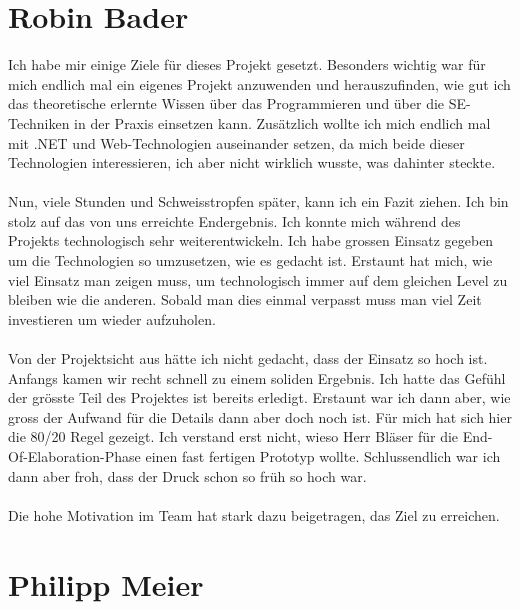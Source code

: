 	\section{Robin Bader}
	Ich habe mir einige Ziele für dieses Projekt gesetzt. Besonders wichtig war für mich endlich mal ein eigenes Projekt anzuwenden und herauszufinden, wie gut ich das theoretische erlernte Wissen über das Programmieren und über die SE-Techniken in der Praxis einsetzen kann. Zusätzlich wollte ich mich endlich mal mit .NET und Web-Technologien auseinander setzen, da mich beide dieser Technologien interessieren, ich aber nicht wirklich wusste, was dahinter steckte.\\ \\
Nun, viele Stunden und Schweisstropfen später, kann ich ein Fazit ziehen. Ich bin stolz auf das von uns erreichte Endergebnis. Ich konnte mich während des Projekts technologisch sehr weiterentwickeln. Ich habe grossen Einsatz gegeben um die Technologien so umzusetzen, wie es gedacht ist. Erstaunt hat mich, wie viel Einsatz man zeigen muss, um technologisch immer auf dem gleichen Level zu bleiben wie die anderen. Sobald man dies einmal verpasst muss man viel Zeit investieren um wieder aufzuholen.\\ \\
Von der Projektsicht aus hätte ich nicht gedacht, dass der Einsatz so hoch ist. Anfangs kamen wir recht schnell zu einem soliden Ergebnis. Ich hatte das Gefühl der grösste Teil des Projektes ist bereits erledigt. Erstaunt war ich dann aber, wie gross der Aufwand für die Details dann aber doch noch ist. Für mich hat sich hier die 80/20 Regel gezeigt. Ich verstand erst nicht, wieso Herr Bläser für die End-Of-Elaboration-Phase einen fast fertigen Prototyp wollte. Schlussendlich war ich dann aber froh, dass der Druck schon so früh so hoch war.\\ \\
Die hohe Motivation im Team hat stark dazu beigetragen, das Ziel zu erreichen.


	\section{Philipp Meier}
	
	
